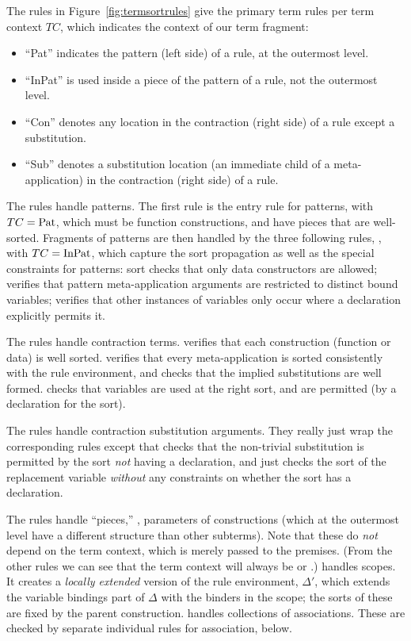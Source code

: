 \documentclass[letterpaper,10pt]{proc}
\begin{document}
The rules in Figure~\ref{fig:termsortrules} give the primary term rules per term context $TC$, which
indicates the context of our term fragment:
\begin{itemize}
\item ``Pat'' indicates the pattern (left side) of a rule, at the outermost level.
\item ``InPat'' is used inside a piece of the pattern of a rule, not the outermost level.
\item ``Con'' denotes any location in the contraction (right side) of a rule except a substitution.
\item ``Sub'' denotes a substitution location (an immediate child of a meta-application) in the
  contraction (right side) of a rule.
\end{itemize}
The  rules handle patterns. The first rule  is the entry rule
for patterns, with $TC=\operatorname{Pat}$, which must be function constructions, and have pieces that are
well-sorted. Fragments of patterns are then handled by the three following rules,
, with $TC=\operatorname{InPat}$, which capture the sort propagation as
well as the special constraints for patterns:
 sort checks that only data constructors are allowed;
 verifies that pattern meta-application arguments are restricted to distinct bound
variables;
 verifies that other instances of variables only occur where a 
declaration explicitly permits it.

The  rules handle contraction terms.
 verifies that each construction (function or data) is well sorted.
 verifies that every meta-application is sorted consistently with the rule
environment, and checks that the implied substitutions are well formed.
 checks that variables are used at the right sort, and are permitted (by a
 declaration for the sort).

The  rules handle contraction substitution arguments. They really just wrap the
corresponding  rules except that  checks that the
non-trivial substitution is permitted by the sort \emph{not} having a  declaration,
and  just checks the sort of the replacement variable \emph{without} any
constraints on whether the sort has a  declaration.

The  rules handle ``pieces,'' \ie, parameters of constructions (which at the
outermost level have a different structure than other subterms). Note that these do \emph{not}
depend on the term context, which is merely passed to the premises. (From the other rules we can
see that the term context will always be  or .)
 handles scopes. It creates a \emph{locally extended} version of the rule
environment, $Δ'$, which extends the variable bindings part of $Δ$ with the binders in the scope;
the sorts of these are fixed by the parent construction.
 handles collections of associations. These are checked by separate individual
rules for association, below.
\end{document}
